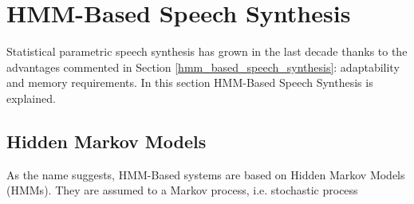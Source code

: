 \section{HMM-Based Speech Synthesis}
\label{hmm_synthesis}
Statistical parametric speech synthesis has grown in the last decade thanks to the advantages commented in Section \ref{hmm_based_speech_synthesis}: adaptability and memory requirements. In this section HMM-Based Speech Synthesis is explained.

\subsection{Hidden Markov Models}
\label{hmm_syntheis_markov}
As the name suggests, HMM-Based systems are based on Hidden Markov Models (HMMs). They are assumed to a Markov process, i.e. stochastic process 